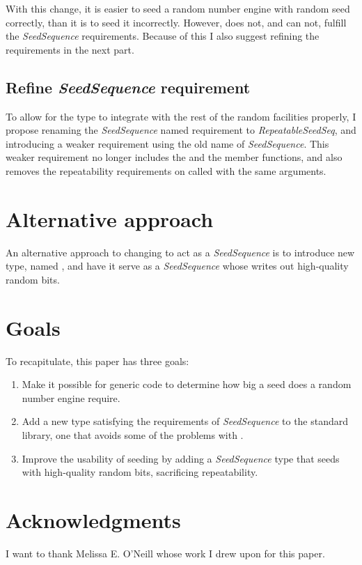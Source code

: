 \documentclass{wg21}
\begin{document}
With this change, it is easier to seed a random number engine with
random seed correctly, than it is to seed it incorrectly. However,
 does not, and can not, fulfill the
\emph{SeedSequence} requirements. Because of this I also suggest refining
the requirements in the next part.


\hypertarget{solution-3-different-requirement}{%
    \subsection{Refine \emph{SeedSequence} requirement}
\label{solution-3-different-requirement}}

To allow for the type  to integrate with
the rest of the random facilities properly, I propose renaming the
\emph{SeedSequence} named requirement to \emph{RepeatableSeedSeq}, and
introducing a weaker requirement using the old name of \emph{SeedSequence}.
This weaker requirement no longer includes the  and the
 member functions, and also removes the repeatability
requirements on  called with the same arguments.


\hypertarget{alternative-approach}{%
    \section{Alternative approach}\label{alternative-approach}}

An alternative approach to changing  to act
as a \emph{SeedSequence} is to introduce new type, named
, and have it serve as a \emph{SeedSequence}
whose  writes out high-quality random bits.

\hypertarget{goals}{%
    \section{Goals}\label{goals}}

To recapitulate, this paper has three goals:
\begin{enumerate}
    \item Make it possible for generic code to determine how big a seed
    does a random number engine require.
    \item Add a new type satisfying the requirements of \emph{SeedSequence}
    to the standard library, one that avoids some of the problems with
    .
    \item Improve the usability of seeding by adding a \emph{SeedSequence}
    type that seeds with high-quality random bits, sacrificing
    repeatability.
\end{enumerate}


\hypertarget{acknowledgments}{
\section{Acknowledgments}
\label{acknowledgments}}

I want to thank Melissa E. O'Neill whose work I drew upon for this paper.
\end{document}
